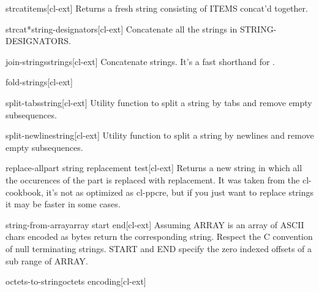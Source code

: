 \documentclass[10pt,english]{book}
\begin{document}
\begin{function}{strcat}{\rest items}[cl-ext]
  Returns a fresh string consisting of ITEMS concat'd together.
\end{function}

\begin{function}{strcat*}{string-designators}[cl-ext]
  Concatenate all the strings in STRING-DESIGNATORS.
\end{function}

\begin{function}{join-strings}{strings}[cl-ext]
  Concatenate strings. It's a fast shorthand for .
\end{function}

\begin{function}{fold-strings}{}[cl-ext]
  
\end{function}

\begin{function}{split-tabs}{string}[cl-ext]
  Utility function to split a string by tabs and remove empty
  subsequences.
\end{function}

\begin{function}{split-newline}{string}[cl-ext]
  Utility function to split a string by newlines and remove empty
  subsequences.
\end{function}

\begin{function}{replace-all}{part string replacement \key test}[cl-ext]
  Returns a new string in which all the occurences of the part is
  replaced with replacement. It was taken from the cl-cookbook, it's
  not as optimized as cl-ppcre, but if you just want to replace
  strings it may be faster in some cases.
\end{function}

\begin{function}{string-from-array}{array \key start end}[cl-ext]
  Assuming ARRAY is an array of ASCII chars encoded as bytes return
the corresponding string. Respect the C convention of null terminating
strings. START and END specify the zero indexed offsets of a sub range
of ARRAY.
\end{function}

\begin{function}{octets-to-string}{octets encoding}[cl-ext]
  
\end{function}
\end{document}
